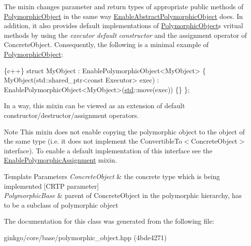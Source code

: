 The mixin changes parameter and return types of appropriate public methods of \hyperlink{classgko_1_1PolymorphicObject}{Polymorphic\+Object} in the same way \hyperlink{classgko_1_1EnableAbstractPolymorphicObject}{Enable\+Abstract\+Polymorphic\+Object} does. In addition, it also provides default implementations of \hyperlink{classgko_1_1PolymorphicObject}{Polymorphic\+Object}\textquotesingle{}s vritual methods by using the {\itshape executor default constructor} and the assignment operator of Concrete\+Object. Consequently, the following is a minimal example of \hyperlink{classgko_1_1PolymorphicObject}{Polymorphic\+Object}\+:


\begin{DoxyCode}
\{c++\}
\textcolor{keyword}{struct }MyObject : EnablePolymorphicObject<MyObject> \{
    MyObject(std::shared\_ptr<const Executor> exec)
        : EnablePolymorphicObject<MyObject>(\hyperlink{namespacestd}{std}::move(exec))
    \{\}
\};
\end{DoxyCode}


In a way, this mixin can be viewed as an extension of default constructor/destructor/assignment operators.

\begin{DoxyNote}{Note}
This mixin does not enable copying the polymorphic object to the object of the same type (i.\+e. it does not implement the Convertible\+To$<$\+Concrete\+Object$>$ interface). To enable a default implementation of this interface see the \hyperlink{classgko_1_1EnablePolymorphicAssignment}{Enable\+Polymorphic\+Assignment} mixin.
\end{DoxyNote}

\begin{DoxyTemplParams}{Template Parameters}
{\em Concrete\+Object} & the concrete type which is being implemented \mbox{[}C\+R\+TP parameter\mbox{]} \\
\hline
{\em Polymorphic\+Base} & parent of Concrete\+Object in the polymorphic hierarchy, has to be a subclass of polymorphic object \\
\hline
\end{DoxyTemplParams}


The documentation for this class was generated from the following file\+:\begin{DoxyCompactItemize}
\item 
ginkgo/core/base/polymorphic\+\_\+object.\+hpp (4bde4271)\end{DoxyCompactItemize}

